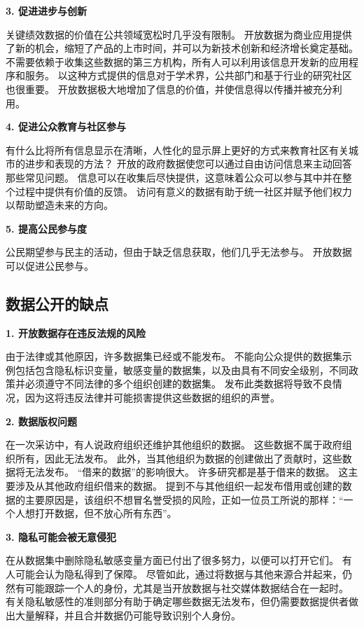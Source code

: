 \documentclass[a4paper, 11pt,twoside=true,UTF8]{scrartcl}
\begin{document}
\textbf{3. 促进进步与创新}

关键绩效数据的价值在公共领域宽松时几乎没有限制。 开放数据为商业应用提供了新的机会，缩短了产品的上市时间，并可以为新技术创新和经济增长奠定基础。 不需要依赖于收集这些数据的第三方机构，所有人可以利用该信息开发新的应用程序和服务。 以这种方式提供的信息对于学术界，公共部门和基于行业的研究社区也很重要。 开放数据极大地增加了信息的价值，并使信息得以传播并被充分利用。

\textbf{4. 促进公众教育与社区参与}

有什么比将所有信息显示在清晰，人性化的显示屏上更好的方式来教育社区有关城市的进步和表现的方法？ 开放的政府数据使您可以通过自由访问信息来主动回答那些常见问题。 信息可以在收集后尽快提供，这意味着公众可以参与其中并在整个过程中提供有价值的反馈。 访问有意义的数据有助于统一社区并赋予他们权力以帮助塑造未来的方向。

\textbf{5. 提高公民参与度}

公民期望参与民主的活动，但由于缺乏信息获取，他们几乎无法参与。 开放数据可以促进公民参与。

\subsection{数据公开的缺点}
\qquad \textbf{1. 开放数据存在违反法规的风险}

由于法律或其他原因，许多数据集已经或不能发布。 不能向公众提供的数据集示例包括包含隐私标识变量，敏感变量的数据集，以及由具有不同安全级别，不同政策并必须遵守不同法律的多个组织创建的数据集。 发布此类数据将导致不良情况，因为这将违反法律并可能损害提供这些数据的组织的声誉。

\textbf{2. 数据版权问题}

在一次采访中，有人说政府组织还维护其他组织的数据。 这些数据不属于政府组织所有，因此无法发布。 此外，当其他组织为数据的创建做出了贡献时，这些数据将无法发布。 “借来的数据”的影响很大。 许多研究都是基于借来的数据。 这主要涉及从其他政府组织借来的数据。 提到不与其他组织一起发布借用或创建的数据的主要原因是，该组织不想冒名誉受损的风险，正如一位员工所说的那样：“一个人想打开数据，但不放心所有东西”。

\textbf{3. 隐私可能会被无意侵犯}

在从数据集中删除隐私敏感变量方面已付出了很多努力，以便可以打开它们。 有人可能会认为隐私得到了保障。 尽管如此，通过将数据与其他来源合并起来，仍然有可能跟踪一个人的身份，尤其是当开放数据与社交媒体数据结合在一起时。 有关隐私敏感性的准则部分有助于确定哪些数据无法发布，但仍需要数据提供者做出大量解释，并且合并数据仍可能导致识别个人身份。
\end{document}
